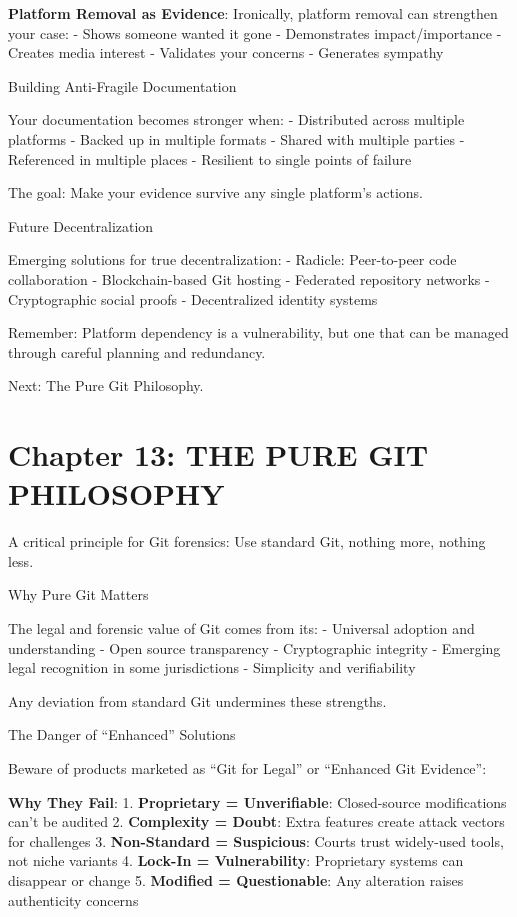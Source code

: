 \textbf{Platform Removal as Evidence}: Ironically, platform removal can
strengthen your case: - Shows someone wanted it gone - Demonstrates
impact/importance - Creates media interest - Validates your concerns -
Generates sympathy

Building Anti-Fragile Documentation

Your documentation becomes stronger when: - Distributed across multiple
platforms - Backed up in multiple formats - Shared with multiple parties
- Referenced in multiple places - Resilient to single points of failure

The goal: Make your evidence survive any single platform's actions.

Future Decentralization

Emerging solutions for true decentralization: - Radicle: Peer-to-peer
code collaboration - Blockchain-based Git hosting - Federated repository
networks - Cryptographic social proofs - Decentralized identity systems

Remember: Platform dependency is a vulnerability, but one that can be
managed through careful planning and redundancy.

Next: The Pure Git Philosophy.

\section{Chapter 13: THE PURE GIT
PHILOSOPHY}\label{chapter-13-the-pure-git-philosophy}

A critical principle for Git forensics: Use standard Git, nothing more,
nothing less.

Why Pure Git Matters

The legal and forensic value of Git comes from its: - Universal adoption
and understanding - Open source transparency - Cryptographic integrity -
Emerging legal recognition in some jurisdictions - Simplicity and
verifiability

Any deviation from standard Git undermines these strengths.

The Danger of ``Enhanced'' Solutions

Beware of products marketed as ``Git for Legal'' or ``Enhanced Git
Evidence'':

\textbf{Why They Fail}: 1. \textbf{Proprietary = Unverifiable}:
Closed-source modifications can't be audited 2. \textbf{Complexity =
Doubt}: Extra features create attack vectors for challenges 3.
\textbf{Non-Standard = Suspicious}: Courts trust widely-used tools, not
niche variants 4. \textbf{Lock-In = Vulnerability}: Proprietary systems
can disappear or change 5. \textbf{Modified = Questionable}: Any
alteration raises authenticity concerns

